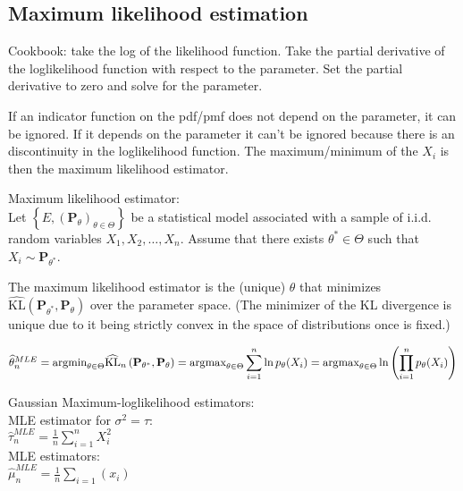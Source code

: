 \subsection*{Maximum likelihood estimation}

Cookbook: take the log of the likelihood function. Take the partial derivative of the loglikelihood function with respect to the parameter. Set the partial derivative to zero and solve for the parameter.

If an indicator function on the pdf/pmf does not depend on the parameter, it can be ignored. If it depends on the parameter it can't be ignored because there is an discontinuity in the loglikelihood function. The maximum/minimum of the $X_i$ is then the maximum likelihood estimator.

Maximum likelihood estimator:\\

Let $\left\{ E,\left(\mathbf{P}_{\theta }\right)_{\theta \in \Theta }\right\}$  be a statistical model associated with a sample of i.i.d. random variables $X_1, X_2, \dots , X_ n$. Assume that there exists $\theta ^* \in \Theta$ such that $X_ i \sim \mathbf{P}_{\theta ^*}$.

The maximum likelihood estimator is the (unique) $\theta$ that minimizes $\widehat{\text {KL}}\left(\mathbf{P}_{\theta ^*}, \mathbf{P}_{\theta }\right)$ over the parameter space. (The minimizer of the KL divergence is unique due to it being strictly convex in the space of distributions once  is fixed.)

$\widehat{\theta }_ n^{MLE} =\\ \displaystyle \text {argmin}_{\theta \in \Theta }\widehat{\text {KL}}_ n\left(\mathbf{P}_{\theta ^*}, \mathbf{P}_{\theta }\right) =\\ \displaystyle \text {argmax}_{\theta \in \Theta } \sum _{i=1}^{n} \ln p_{\theta }(X_ i) =\\  \displaystyle \text {argmax}_{\theta \in \Theta } \ln \left(\prod _{i=1}^{n} p_{\theta }(X_ i)\right)$

Gaussian Maximum-loglikelihood estimators:\\

 MLE estimator for $\sigma^2 = \tau$:\\  
$\hat{\tau }_ n^{MLE} = \frac{1}{n} \sum _{i = 1}^ n X_ i^2$\\

MLE estimators:\\

$\hat{\mu}_ n^{MLE}=\frac{1}{n}\sum_{i=1}(x_i)$

